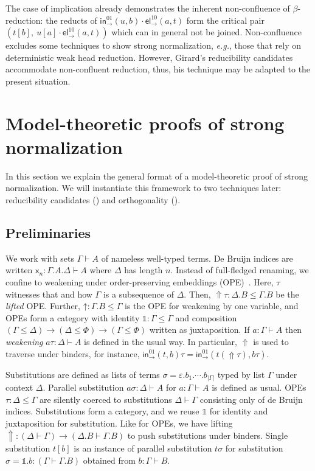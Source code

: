 \documentclass[a4paper,USenglish,cleveref, autoref, thm-restate]{lipics-v2021}
\newcommand{\eg}{\emph{e.g.}\xspace}
\newcommand{\sid}{\mathds{1}}
\newcommand{\Ge}{\ensuremath{\varepsilon}}
\newcommand{\x}{\mathsf{x}}
\newcommand{\tin}{\ensuremath{\mathsf{in}}}
\newcommand{\inn}[2]{\ensuremath{\tin_{#1}^{#2}}}
\newcommand{\tel}{\mathsf{el}}
\newcommand{\el}[2]{\ensuremath{\tel_{#1}^{#2}}}
\newcommand{\Up}{\mathop{\Uparrow}}
\newcommand{\up}{\mathord{\uparrow}}
\begin{document}
The case of implication already demonstrates the inherent
non-confluence of $\beta$-reduction: the reducts of
$\inn\to{01}(u,b) \cdot \el\to{10}(a,t)$ form the critical pair
$(t[b],\ u[a] \cdot \el\to{10}(a,t))$ which can in general not be
joined.  Non-confluence excludes some techniques to show strong
normalization, \eg, those that rely on deterministic weak head
reduction.  However, Girard's reducibility candidates accommodate
non-confluent reduction, thus, his technique may be adapted to the
present situation.

\section{Model-theoretic proofs of strong normalization}
\label{sec:model}

In this section we explain the general format of a model-theoretic
proof of strong normalization.  We will instantiate this framework to two techniques later: reducibility candidates () and orthogonality ().

\subsection{Preliminaries}
\label{sec:prelim}

We work with sets $\Gamma \vdash A$ of nameless well-typed terms.
De Bruijn indices are written $\x_n : \Gamma.A.\Delta \vdash A$ where
$\Delta$ has length $n$.
Instead of full-fledged renaming, we confine to
weakening under order-preserving embeddings (OPE)
\fbox{$\tau : \Delta \leq \Gamma$}\,.  Here, $\tau$ witnesses that and how
$\Gamma$ is a subsequence of $\Delta$.
Then, $\Up\tau : \Delta.B \leq \Gamma.B$ be the \emph{lifted} OPE.
Further, $\up : \Gamma.B \leq \Gamma$ is the OPE for weakening by one
variable, and OPEs form a category with identity $\sid : \Gamma \leq
\Gamma$ and composition %
$(\Gamma \leq \Delta) \to (\Delta \leq \Phi) \to (\Gamma \leq \Phi)$
written as juxtaposition.
If $a : \Gamma \vdash A$ then
\emph{weakening} $a\tau : \Delta \vdash A$ is defined in the usual way.
In particular, $\Up$ is used to traverse under binders, for instance,
$\inn\to{01}(t,b)\tau = \inn\to{01}(t(\Up\tau),b\tau)$.

Substitutions \fbox{$\sigma : \Delta \vdash \Gamma$} are defined as lists of
terms $\sigma = \Ge.b_1.\cdots.b_{|\Gamma|}$
typed by list $\Gamma$ under context $\Delta$.  Parallel
substitution $a\sigma : \Delta \vdash A$ for $a : \Gamma \vdash A$ is
defined as usual.  OPEs $\tau : \Delta \leq \Gamma$ are silently
coerced to substitutions $\Delta \vdash \Gamma$ consisting only of de
Bruijn indices.
Substitutions form a category, and we reuse $\sid$ for
identity and %
juxtaposition for substitution.
Like for OPEs, we have lifting
$\Up : (\Delta \vdash \Gamma) \to (\Delta.B \vdash \Gamma.B)$ to push
substitutions under binders.
%
Single substitution $t[b]$ is
an instance of parallel substitution $t\sigma$ for substitution
$\sigma = \sid.b : (\Gamma \vdash \Gamma.B)$ obtained from $b : \Gamma \vdash B$.
\end{document}
